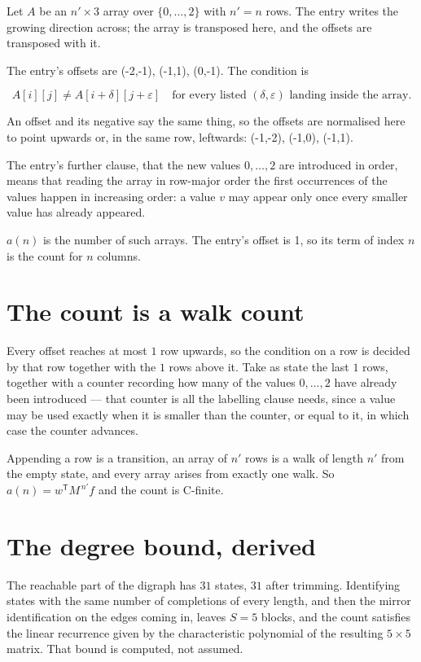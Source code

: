 \documentclass[11pt]{article}
\theoremstyle{definition}
\begin{document}
Let $A$ be an $n' \times 3$ array over $\{0,\dots,2\}$ with $n' = n$ rows. The entry writes the growing direction across; the array is transposed here, and the offsets are transposed with it.

The entry's offsets are (-2,-1), (-1,1), (0,-1). The condition is

\[A[i][j] \ne A[i{+}\delta][j{+}\varepsilon]\quad\text{for every listed }(\delta,\varepsilon)\text{ landing inside the array.}\]

An offset and its negative say the same thing, so the offsets are normalised here to point upwards or, in the same row, leftwards: (-1,-2), (-1,0), (-1,1).

The entry's further clause, that the new values $0,\dots,2$ are introduced in order, means that reading the array in row-major order the first occurrences of the values happen in increasing order: a value $v$ may appear only once every smaller value has already appeared.

$a(n)$ is the number of such arrays. The entry's offset is 1, so its term of index $n$ is the count for $n$ columns.

\section{The count is a walk count}

Every offset reaches at most $1$ row upwards, so the condition on a row is decided by that row together with the $1$ rows above it. Take as state the last $1$ rows, together with a counter recording how many of the values $0,\dots,2$ have already been introduced --- that counter is all the labelling clause needs, since a value may be used exactly when it is smaller than the counter, or equal to it, in which case the counter advances.

Appending a row is a transition, an array of $n'$ rows is a walk of length $n'$ from the empty state, and every array arises from exactly one walk. So $a(n) = w^{\mathsf T}M^{\,n'}f$ and the count is C-finite.

\section{The degree bound, derived}

The reachable part of the digraph has $31$ states, $31$ after trimming. Identifying states with the same number of completions of every length, and then the mirror identification on the edges coming in, leaves $S = 5$ blocks, and the count satisfies the linear recurrence given by the characteristic polynomial of the resulting $5\times5$ matrix. That bound is computed, not assumed.
\end{document}
